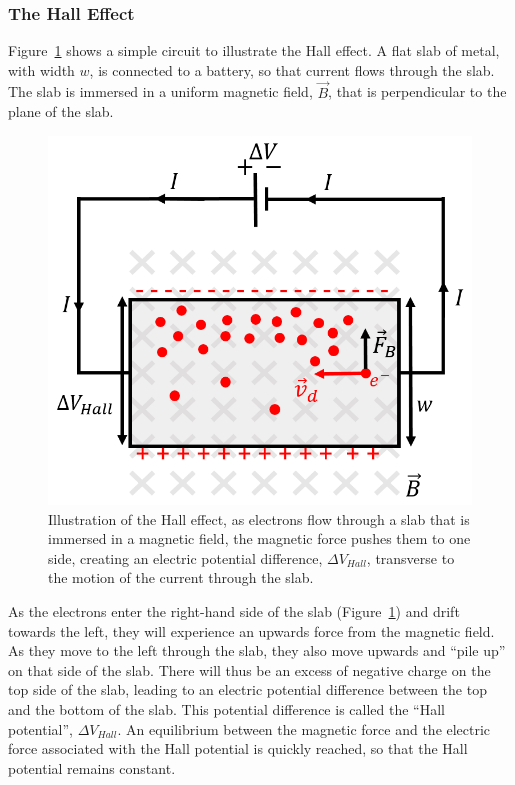 \subsubsection{The Hall Effect}

Figure~\ref{fig:magneticforce:hallV} shows a simple circuit to illustrate the Hall effect. A flat slab of metal, with width $w$, is connected to a battery, so that current flows through the slab. The slab is immersed in a uniform magnetic field, $\vec B$, that is perpendicular to the plane of the slab.

\begin{figure}[!htbp]
\centering
\includegraphics[width=0.4\linewidth]{files/hallV-6f069422571cd8cd2b314a481b286e52.png}
\caption[]{Illustration of the Hall effect, as electrons flow through a slab that is immersed in a magnetic field, the magnetic force pushes them to one side, creating an electric potential difference, $\Delta V_{Hall}$, transverse to the motion of the current through the slab.}
\label{fig:magneticforce:hallV}
\end{figure}

As the electrons enter the right-hand side of the slab (Figure~\ref{fig:magneticforce:hallV}) and drift towards the left, they will experience an upwards force from the magnetic field. As they move to the left through the slab, they also move upwards and ``pile up'' on that side of the slab. There will thus be an excess of negative charge on the top side of the slab, leading to an electric potential difference between the top and the bottom of the slab. This potential difference is called the ``Hall potential'', $\Delta V_{Hall}$. An equilibrium between the magnetic force and the electric force associated with the Hall potential is quickly reached, so that the Hall potential remains constant.

